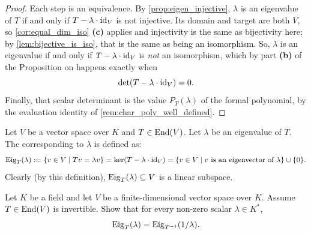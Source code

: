 \begin{proof}
Each step is an equivalence. By \cref{prop:eigen_injective}, $\lambda$ is an eigenvalue of $T$ if and only if $T - \lambda \cdot \operatorname{id}_V$ is not injective. Its domain and target are both $V$, so \cref{cor:equal_dim_iso} \textbf{(c)} applies and injectivity is the same as bijectivity here; by \cref{lem:bijective_is_iso}, that is the same as being an isomorphism. So, $\lambda$ is an eigenvalue if and only if $T - \lambda \cdot \operatorname{id}_V$ is \emph{not} an isomorphism, which by part \textbf{(b)} of the Proposition on  happens exactly when
\[
\det(T - \lambda \cdot \operatorname{id}_V) = 0.
\]
Finally, that scalar determinant is the value $P_T(\lambda)$ of the formal polynomial, by the evaluation identity of \cref{rem:char_poly_well_defined}.
\end{proof}

\begin{definition}[Eigenspace]\label{def:eigenspace}
  Let $V$ be a vector space over $K$ and $T \in \operatorname{End}(V)$. Let $\lambda$ be an eigenvalue of $T$. The  corresponding to $\lambda$ is defined as:
  \[ \operatorname{Eig}_T(\lambda) := \{v \in V \mid Tv = \lambda v\} = \ker(T - \lambda \cdot \operatorname{id}_V) = \{v \in V \mid v \text{ is an eigenvector of } \lambda\} \cup \{0\}. \]
  Clearly (by this definition), $\operatorname{Eig}_T(\lambda) \subseteq V$ is a linear subspace.
\end{definition}

\begin{exercise}
  \label{exc:eigenspaces_inverse_endomorphism}
  Let $K$ be a field and let $V$ be a finite-dimensional vector space over $K$. Assume $T \in \operatorname{End}(V)$ is invertible. Show that for every non-zero scalar $\lambda \in K^*$,
  \[
  \operatorname{Eig}_T(\lambda) = \operatorname{Eig}_{T^{-1}}(1/\lambda).
  \]
\end{exercise}

